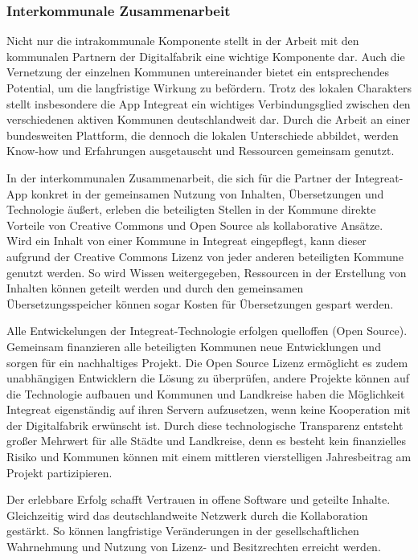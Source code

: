 \documentclass[12pt, a4paper]{article} %
\begin{document}
\hypertarget{interkommunale-zusammenarbeit}{%
\subsubsection{Interkommunale
Zusammenarbeit}\label{interkommunale-zusammenarbeit}}

Nicht nur die intrakommunale Komponente stellt in der Arbeit mit den
kommunalen Partnern der Digitalfabrik eine wichtige Komponente dar. Auch
die Vernetzung der einzelnen Kommunen untereinander bietet ein
entsprechendes Potential, um die langfristige Wirkung zu befördern.
Trotz des lokalen Charakters stellt insbesondere die App Integreat ein
wichtiges Verbindungsglied zwischen den verschiedenen aktiven Kommunen
deutschlandweit dar. Durch die Arbeit an einer bundesweiten Plattform,
die dennoch die lokalen Unterschiede abbildet, werden Know-how und
Erfahrungen ausgetauscht und Ressourcen gemeinsam genutzt.

In der interkommunalen Zusammenarbeit, die sich für die Partner der
Integreat-App konkret in der gemeinsamen Nutzung von Inhalten,
Übersetzungen und Technologie äußert, erleben die beteiligten Stellen in
der Kommune direkte Vorteile von Creative Commons und Open Source als
kollaborative Ansätze. Wird ein Inhalt von einer Kommune in Integreat
eingepflegt, kann dieser aufgrund der Creative Commons Lizenz von jeder
anderen beteiligten Kommune genutzt werden. So wird Wissen
weitergegeben, Ressourcen in der Erstellung von Inhalten können geteilt
werden und durch den gemeinsamen Übersetzungsspeicher können sogar
Kosten für Übersetzungen gespart werden.

Alle Entwickelungen der Integreat-Technologie erfolgen quelloffen (Open
Source). Gemeinsam finanzieren alle beteiligten Kommunen neue
Entwicklungen und sorgen für ein nachhaltiges Projekt. Die Open Source
Lizenz ermöglicht es zudem unabhängigen Entwicklern die Lösung zu
überprüfen, andere Projekte können auf die Technologie aufbauen und
Kommunen und Landkreise haben die Möglichkeit Integreat eigenständig auf
ihren Servern aufzusetzen, wenn keine Kooperation mit der Digitalfabrik
erwünscht ist. Durch diese technologische Transparenz entsteht großer
Mehrwert für alle Städte und Landkreise, denn es besteht kein
finanzielles Risiko und Kommunen können mit einem mittleren
vierstelligen Jahresbeitrag am Projekt partizipieren.

Der erlebbare Erfolg schafft Vertrauen in offene Software und geteilte
Inhalte. Gleichzeitig wird das deutschlandweite Netzwerk durch die
Kollaboration gestärkt. So können langfristige Veränderungen in der
gesellschaftlichen Wahrnehmung und Nutzung von Lizenz- und Besitzrechten
erreicht werden.
\end{document}
